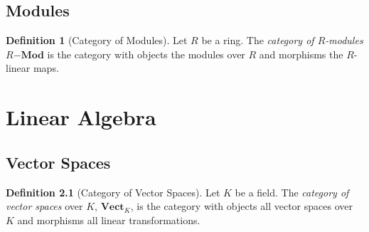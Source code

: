 \documentclass{book}
\theoremstyle{definition}
\newtheorem{definition}[lemma]{Definition}
\begin{document}
\section{Modules}

\begin{definition}[Category of Modules]
    Let $R$ be a ring. The \emph{category of $R$-modules} $R\mathbf{-Mod}$ is the category with objects the modules over $R$
    and morphisms the $R$-linear maps.
\end{definition}

\chapter{Linear Algebra}

\section{Vector Spaces}

\begin{definition}[Category of Vector Spaces]
    Let $K$ be a field. The \emph{category of vector spaces} over $K$, $\mathbf{Vect}_K$,
    is the category with objects all vector spaces over $K$ and morphisms all linear transformations.
\end{definition}
\end{document}
